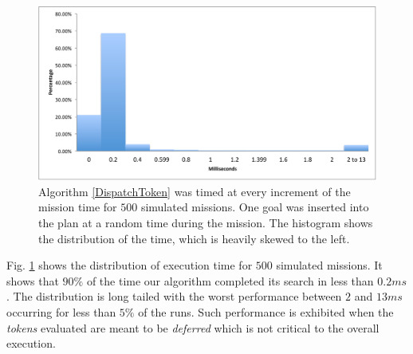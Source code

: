 \begin{figure}[!b]
  \centering
  \includegraphics[width=\columnwidth]{figs/HistogramAlg1}
  \caption{\small Algorithm \ref{DispatchToken} was timed at every
    increment of the mission time for $500$ simulated missions. One
    goal was inserted into the plan at a random time during the
    mission. The histogram shows the distribution of the time, which
    is heavily skewed to the left.}
  \label{fig:histogram}
\end{figure}

Fig. \ref{fig:histogram} shows the distribution of execution time for
$500$ simulated missions. It shows that $90\%$ of the time our
algorithm completed its search in less than $0.2 ms$. The distribution
is long tailed with the worst performance between $2$ and $13ms$
occurring for less than $5\%$ of the runs. Such performance is
exhibited when the {\em tokens} evaluated are meant to be {\em
  deferred} which is not critical to the overall execution.



